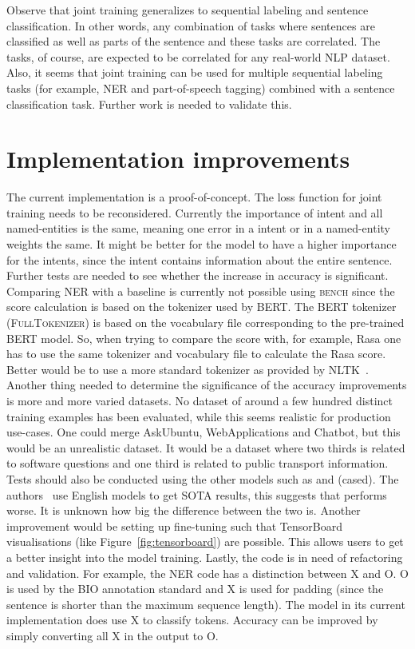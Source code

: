 Observe that joint training generalizes to sequential labeling and sentence classification.
In other words, any combination of tasks where sentences are classified as well as parts of the sentence and these tasks are correlated.
The tasks, of course, are expected to be correlated for any real-world NLP dataset.
Also, it seems that joint training can be used for multiple sequential labeling tasks (for example, NER and part-of-speech tagging) combined with a sentence classification task.
Further work is needed to validate this.

\section{Implementation improvements}
\label{sec:implementation_improvements}
The current implementation is a proof-of-concept.
The loss function for joint training needs to be reconsidered.
Currently the importance of intent and all named-entities is the same, meaning one error in a intent or in a named-entity weights the same.
It might be better for the model to have a higher importance for the intents, since the intent contains information about the entire sentence.
Further tests are needed to see whether the increase in accuracy is significant.
Comparing NER with a baseline is currently not possible using \textsc{bench} since the \fone score calculation is based on the tokenizer used by BERT.
The BERT tokenizer (\textsc{FullTokenizer}) is based on the vocabulary file corresponding to the pre-trained BERT model.
So, when trying to compare the score with, for example, Rasa one has to use the same tokenizer and vocabulary file to calculate the Rasa score.
Better would be to use a more standard tokenizer as provided by NLTK~\citep{bird2004nltk}.
Another thing needed to determine the significance of the accuracy improvements is more and more varied datasets.
No dataset of around a few hundred distinct training examples has been evaluated, while this seems realistic for production use-cases.
One could merge AskUbuntu, WebApplications and Chatbot, but this would be an unrealistic dataset.
It would be a dataset where two thirds is related to software questions and one third is related to public transport information.
Tests should also be conducted using the other models such as  and  (cased).
The authors~\citep{devlin2018} use English models to get SOTA results, this suggests that  performs worse.
It is unknown how big the difference between the two is.
Another improvement would be setting up fine-tuning such that TensorBoard visualisations (like Figure~\ref{fig:tensorboard}) are possible.
This allows users to get a better insight into the model training.
Lastly, the code is in need of refactoring and validation.
For example, the NER code has a distinction between X and O.
O is used by the BIO annotation standard and X is used for padding (since the sentence is shorter than the maximum sequence length).
The model in its current implementation does use X to classify tokens.
Accuracy can be improved by simply converting all X in the output to O.

